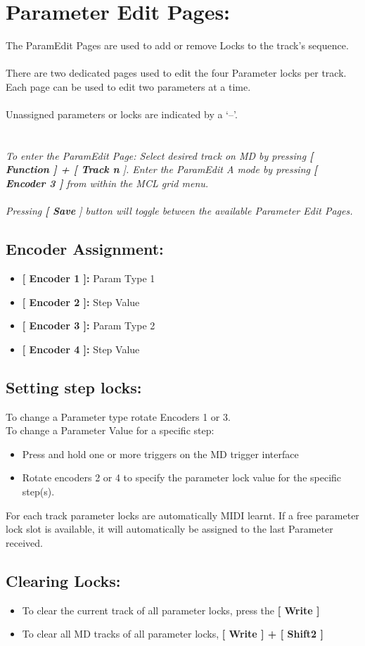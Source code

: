 \chapter{Parameter Edit Pages:}
The ParamEdit Pages are used to add or remove Locks to the track’s sequence.\\
\\
There are two dedicated pages used to edit the four Parameter locks per track.\\
Each page can be used to edit two parameters at a time.\\
\\
Unassigned parameters or locks are indicated by a ‘--’.\\
\\
\\
\textit{To enter the ParamEdit Page: Select desired track on MD by pressing \textbf{[ Function ] + [ Track n }]. Enter the ParamEdit A mode by pressing \textbf{[ Encoder 3 ]} from within the MCL grid menu.}
\\\\
\textit{Pressing \textbf{[ Save }] button will toggle between the available Parameter Edit Pages.}
\section{Encoder Assignment:}
\begin{itemize}
	\item \textbf{[ Encoder 1 ]: } Param Type 1
	\item \textbf{[ Encoder 2 ]: } Step Value
	\item \textbf{[ Encoder 3 ]: } Param Type 2
	\item \textbf{[ Encoder 4 ]: } Step Value
\end{itemize}
\section{Setting step locks:}
To change a Parameter type rotate Encoders 1 or 3.\\
To change a Parameter Value for a specific step:
\begin{itemize}
\item Press and hold one or more triggers on the MD trigger interface
\item Rotate encoders 2 or 4 to specify the parameter lock value for the specific step(s).
\end{itemize}
For each track parameter locks are automatically MIDI learnt. If a free parameter lock slot is available, it will automatically be assigned to the last Parameter received. 
\section{Clearing Locks:}
\begin{itemize}
\item To clear the current track of all parameter locks, press the \textbf{[ Write  ]}
\item To clear all MD tracks of all parameter locks, \textbf{[ Write ] + [ Shift2 ]}
\end{itemize}